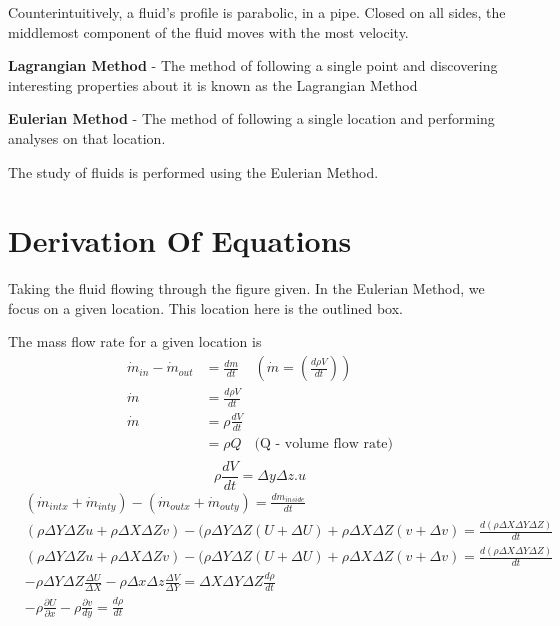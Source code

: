 \documentclass{report}
\begin{document}
Counterintuitively, a fluid's profile is parabolic, in a pipe. Closed on all sides, the middlemost component of the fluid moves with the most velocity.

\begin{note}
\textbf{Lagrangian Method} -
The method of following a single point and discovering interesting properties about it is known as the Lagrangian Method

\textbf{Eulerian Method} -
The method of following a single location and performing analyses on that location.
\end{note}
The study of fluids is performed using the Eulerian Method. 

\section{Derivation Of Equations}
Taking the fluid flowing through the figure given. In the Eulerian Method, we focus on a given location. This location here is the outlined box. 

The mass flow rate for a given location is 
\begin{align*}
  \dot{m}_{in} - \dot{m}_{out} &= \frac{dm}{dt} &(\dot{m} = (\frac{d \rho V}{dt})) \\
  \dot{m} &= \frac{d\rho V}{dt} \\
  \dot{m} &= \rho \frac{dV}{dt} \\
          &= \rho Q & \text{(Q - volume flow rate)} \\
\end{align*}
\[
  \rho \frac{dV}{dt} = \Delta y \Delta z . u
\]
\begin{align*}
  &(\dot{m}_{intx} + \dot{m}_{inty}) - (\dot{m}_{outx} + \dot{m}_{outy}) = \frac{dm_{inside}}{dt} \\
  &(\rho \Delta Y \Delta Z u + \rho \Delta X \Delta Z v) - (\rho \Delta Y \Delta Z (U + \Delta U) + \rho \Delta X \Delta Z ( v + \Delta v) = \frac{d(\rho \Delta X \Delta Y \Delta Z)}{dt} \\
  &(\rho \Delta Y \Delta Z u + \rho \Delta X \Delta Z v) - (\rho \Delta Y \Delta Z (U + \Delta U) + \rho \Delta X \Delta Z ( v + \Delta v) = \frac{d(\rho \Delta X \Delta Y \Delta Z)}{dt} \\
  &- \rho \Delta Y \Delta Z \frac{\Delta U}{\Delta X} - \rho \Delta x \Delta z \frac{\Delta V}{\Delta Y} = \Delta X \Delta Y \Delta Z \frac{d \rho}{dt} \\
  &- \rho \frac{\partial U}{\partial x}  - \rho \frac{\partial v}{dy} = \frac{d\rho}{dt} \\
\end{align*}
\end{document}
